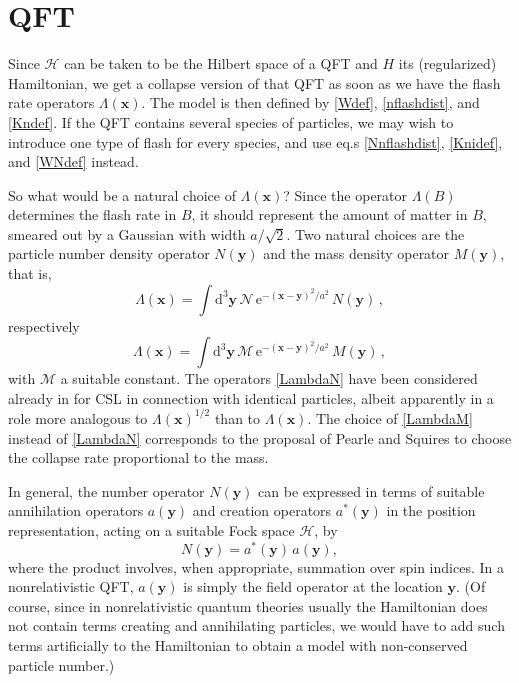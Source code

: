 \documentclass[12pt]{article}
\newcommand{\Hilbert}{\mathscr{H}}
\newcommand{\vx}{\boldsymbol{x}}
\newcommand{\vy}{\boldsymbol{y}}
\newcommand{\D}{\mathrm{d}} %
\newcommand{\E}{\mathrm{e}} %
\newcommand{\1}{1}
\newcommand{\nconst}{\mathcal{N}}
\newcommand{\mconst}{\mathcal{M}}
\newcommand{\z}[1]{{#1}}
\begin{document}
\section{QFT}

Since $\Hilbert$ can be taken to be the Hilbert space of a QFT and $H$ its (regularized) Hamiltonian, we get a collapse version of that QFT as soon as we have the flash rate operators $\Lambda(\vx)$. The model is then defined by \eqref{Wdef}, \eqref{nflashdist}, and \eqref{Kndef}. If the QFT contains several species of particles, we may wish to introduce one type of flash for every species, and use eq.s \eqref{Nnflashdist}, \eqref{Knidef}, and \eqref{WNdef} instead.

So what would be a natural choice of $\Lambda(\vx)$? Since the operator $\Lambda(B)$ determines the flash rate in $B$, it should represent the amount of matter in $B$, smeared out by a Gaussian with width $a/\sqrt{2}$. \z{Two natural choices are the particle number density operator $N(\vy)$ and the mass density operator $M(\vy)$, that is,}
\begin{equation}\label{LambdaN}
  \Lambda(\vx) = \int \D^3 \vy \, \nconst \, \E^{-(\vx-\vy)^2/a^2} \, N(\vy)\,,
\end{equation}
\z{respectively}
\begin{equation}\label{LambdaM}
  \Lambda(\vx) = \int \D^3 \vy \, \mconst \, \E^{-(\vx-\vy)^2/a^2} \, M(\vy)\,,
\end{equation}
\z{with $\mconst$ a suitable constant. The operators \eqref{LambdaN} have been considered already in \cite{GPR90} for CSL in connection with identical particles, albeit apparently in a role more analogous to $\Lambda(\vx)^{1/2}$ than to $\Lambda(\vx)$. The choice of \eqref{LambdaM} instead of \eqref{LambdaN} corresponds to the proposal of Pearle and Squires \cite{PS94} to choose the collapse rate proportional to the mass.}

\z{In general, the number operator $N(\vy)$ can be expressed in terms of suitable annihilation operators $a(\vy)$ and creation operators $a^*(\vy)$ in the position representation, acting on a suitable Fock space $\Hilbert$, by} 
\begin{equation}
  N(\vy) = a^*(\vy) \, a(\vy), 
\end{equation}
\z{where the product involves, when appropriate, summation over spin indices. In a nonrelativistic QFT, $a(\vy)$ is simply the field operator at the location $\vy$. (Of course, since in nonrelativistic quantum theories usually the Hamiltonian does not contain terms creating and annihilating particles, we would have to add such terms artificially to the Hamiltonian to obtain a model with non-conserved particle number.)}
\end{document}
